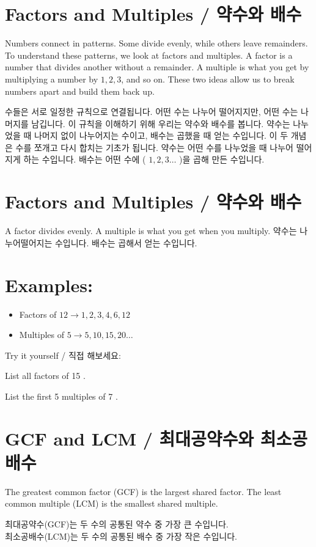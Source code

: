 \documentclass[10pt]{article}
\begin{document}
\section*{Factors and Multiples / 약수와 배수}
Numbers connect in patterns. Some divide evenly, while others leave remainders. To understand these patterns, we look at factors and multiples. A factor is a number that divides another without a remainder. A multiple is what you get by multiplying a number by $1,2,3$, and so on. These two ideas allow us to break numbers apart and build them back up.

수들은 서로 일정한 규칙으로 연결됩니다. 어떤 수는 나누어 떨어지지만, 어떤 수는 나머지를 남깁니다. 이 규칙을 이해하기 위해 우리는 약수와 배수를 봅니다. 약수는 나누었을 때 나머지 없이 나누어지는 수이고, 배수는 곱했을 때 얻는 수입니다. 이 두 개념은 수를 쪼개고 다시 합치는 기초가 됩니다. 약수는 어떤 수를 나누었을 때 나누어 떨어지게 하는 수입니다. 배수는 어떤 수에 ( $1,2,3 \ldots$ )을 곱해 만든 수입니다.

\section*{Factors and Multiples / 약수와 배수}
A factor divides evenly. A multiple is what you get when you multiply. 약수는 나누어떨어지는 수입니다. 배수는 곱해서 얻는 수입니다.

\section*{Examples:}
\begin{itemize}
  \item Factors of $12 \rightarrow 1,2,3,4,6,12$
  \item Multiples of $5 \rightarrow 5,10,15,20 \ldots$
\end{itemize}

Try it yourself / 직접 해보세요:

List all factors of 15 .

List the first 5 multiples of 7 .

\section*{GCF and LCM / 최대공약수와 최소공배수}
The greatest common factor (GCF) is the largest shared factor. The least common multiple (LCM) is the smallest shared multiple.

최대공약수(GCF)는 두 수의 공통된 약수 중 가장 큰 수입니다.\\
최소공배수(LCM)는 두 수의 공통된 배수 중 가장 작은 수입니다.
\end{document}
